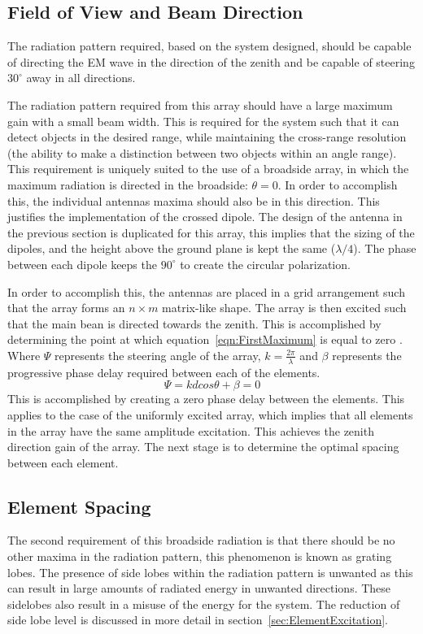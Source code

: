 \documentclass[11pt]{witseiepaper}
\begin{document}
\begin{bibunit}[witseie]
\subsection{Field of View and Beam Direction} \label{sec:FieldofViewandBeamDirection}
The radiation pattern required, based on the system designed, should be capable of directing the EM wave in the direction of the zenith and be capable of steering $30^{\circ}$ away in all directions.

The radiation pattern required from this array should have a large maximum gain with a small beam width. This is required for the system such that it can detect objects in the desired range, while maintaining the cross-range resolution (the ability to make a distinction between two objects within an angle range).
This requirement is uniquely suited to the use of a broadside array, in which the maximum radiation is directed in the broadside: $\theta = 0$. In order to accomplish this, the individual antennas maxima should also be in this direction. This justifies the implementation of the crossed dipole. The design of the antenna in the previous section is duplicated for this array, this implies that the sizing of the dipoles, and the height above the ground plane is kept the same ($\lambda /4$). The phase between each dipole keeps the $90^{\circ}$ to create the circular polarization.

In order to accomplish this, the antennas are placed in a grid arrangement such that the array forms an $n \times m$ matrix-like shape.
The array is then excited such that the main bean is directed towards the zenith. This is accomplished by determining the point at which equation~\ref{eqn:FirstMaximum} is equal to zero \cite[p.~296]{Balanis}. Where $\Psi$ represents the steering angle of the array, $k = \frac{2 \pi}{\lambda}$ and $\beta$ represents the progressive phase delay required between each of the elements.
\begin{equation} \label{eqn:FirstMaximum}
\Psi = k d cos \theta + \beta = 0
\end{equation}
This is accomplished by creating a zero phase delay between the elements. This applies to the case of the uniformly excited array, which implies that all elements in the array have the same amplitude excitation.
This achieves the zenith direction gain of the array. The next stage is to determine the optimal spacing between each element.

\subsection{Element Spacing} \label{sec:ElementSpacing}
The second requirement of this broadside radiation is that there should be no other maxima in the radiation pattern, this phenomenon is known as grating lobes. The presence of side lobes within the radiation pattern is unwanted as this can result in large amounts of radiated energy in unwanted directions. These sidelobes also result in a misuse of the energy for the system. The reduction of side lobe level is discussed in more detail in section~\ref{sec:ElementExcitation}.


\end{bibunit}
\end{document}
